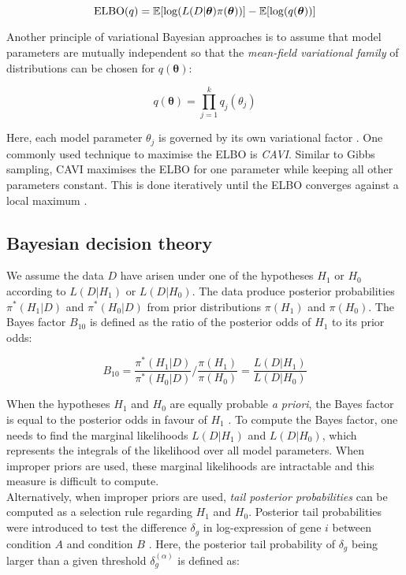\begin{equation}
\textnormal{ELBO}(q)=\mathbb{E}[\log(L(D|\bm{\theta})\pi(\bm{\theta}))] - \mathbb{E}[\log(q(\bm{\theta}))]
\end{equation}

Another principle of variational Bayesian approaches is to assume that model parameters are mutually independent so that the \emph{mean-field variational family} of distributions can be chosen for $q(\bm{\theta})$:

\begin{equation}
q(\bm{\theta})=\prod_{j=1}^k{}q_j(\theta_j)
\end{equation}

Here, each model parameter $\theta_j$ is governed by its own variational factor \citep{Blei2017}. One commonly used technique to maximise the ELBO is \emph{\gls{CAVI}}. Similar to Gibbs sampling, CAVI maximises the ELBO for one parameter while keeping all other parameters constant. This is done iteratively until the ELBO converges against a local maximum \citep{Blei2017}. 

\subsection{Bayesian decision theory} \label{sec0:decision}

We assume the data $D$ have arisen under one of the hypotheses $H_1$ or $H_0$ according to $L(D|H_1)$ or $L(D|H_0)$. The data produce posterior probabilities $\pi^*(H_1|D)$ and $\pi^*(H_0|D)$ from prior distributions $\pi(H_1)$ and $\pi(H_0)$. The Bayes factor $B_{10}$ \citep{Jeffreys1961} is defined as the ratio of the posterior odds of $H_1$ to its prior odds:

\begin{equation}
B_{10}=\frac{\pi^*(H_1|D)}{\pi^*(H_0|D)}/{}\frac{\pi(H_1)}{\pi(H_0)}=\frac{L(D|H_1)}{L(D|H_0)}
\end{equation}  

When the hypotheses $H_1$ and $H_0$ are equally probable \emph{a priori}, the Bayes factor is equal to the posterior odds in favour of $H_1$ \citep{Kass1995}. To compute the Bayes factor, one needs to find the marginal likelihoods $L(D|H_1)$ and $L(D|H_0)$, which represents the integrals of the likelihood over all model parameters. When improper priors are used, these marginal likelihoods are intractable and this measure is difficult to compute. \\

Alternatively, when improper priors are used, \emph{tail posterior probabilities} can be computed as a selection rule regarding $H_1$ and $H_0$. Posterior tail probabilities were introduced to test the difference $\delta_g$ in log-expression of gene $i$ between condition $A$ and condition $B$ \citep{Bochkina2007}. Here, the posterior tail probability of $\delta_g$ being larger than a given threshold $\delta_g^{(\alpha)}$ is defined as:

